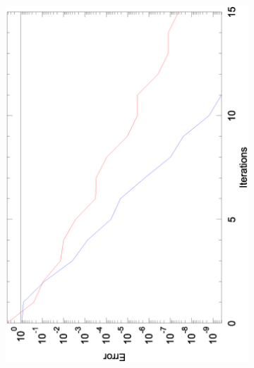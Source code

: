 \documentclass[12pt,parskip=full]{article}
\numberwithin{subsection}{section}
\begin{document}
\begin{figure}[h]
\begin{subfigure}[h]{0.45\textwidth}
				\includegraphics[width=\textwidth, angle=270]{Convergance_1_65.eps}
				\vspace{-13ex}
			\end{subfigure}
			\begin{subfigure}[h]{0.45\textwidth}

\end{subfigure}
\end{figure}
\end{document}
